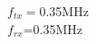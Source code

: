 \documentclass[preview]{standalone}
\begin{document}
\begin{center}
$f_{tx}=$0.35MHz\\$f_{rx}$=0.35MHz
\end{center}
\end{document}
